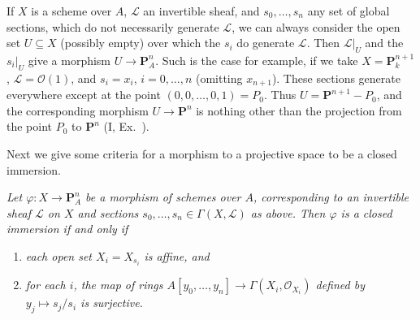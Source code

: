 { If $X$ is a scheme over $A$, $\mathcal L$ an invertible sheaf, and $s_0,\ldots,s_n$ any set of global sections, which do not necessarily generate $\mathcal L$, we can always consider the open set $U\subseteq X$ (possibly empty) over which the $s_i$ do generate $\mathcal L$. Then $\mathcal L|_U$ and the $s_i|_U$ give a morphism $U\to\mathbf P_A^n$. Such is the case for example, if we take $X=\mathbf P_k^{n+1}$, $\mathcal L=\mathcal O(1)$, and $s_i=x_i$, $i=0,\ldots,n$ (omitting $x_{n+1}$). These sections generate everywhere except at the point $(0,0,\ldots,0,1)=P_0$. Thus $U=\mathbf P^{n+1}-P_0$, and the corresponding morphism $U\to\mathbf P^n$ is nothing other than the projection from the point $P_0$ to $\mathbf P^n$ (I, Ex.\ ).

\medskip Next we give some criteria for a morphism to a projective space to be a closed immersion.

 \emph{Let $\varphi\colon X\to\mathbf P_A^n$ be a morphism of schemes over $A$, corresponding to an invertible sheaf $\mathcal L$ on $X$ and sections $s_0,\ldots,s_n\in\Gamma(X,\mathcal L)$ as above. Then $\varphi$ is a closed immersion if and only if}
\begin{enumerate}[label=(\arabic*),leftmargin=2.2em,itemsep=0pt,topsep=2pt,parsep=0pt]
\item\hypertarget{result-II-7.2-1}{} \emph{each open set $X_i=X_{s_i}$ is affine, and}
\item\hypertarget{result-II-7.2-2}{} \emph{for each $i$, the map of rings $A[y_0,\ldots,y_n]\to\Gamma(X_i,\mathcal O_{X_i})$ defined by $y_j\mapsto s_j/s_i$ is surjective.}
\end{enumerate}
}
